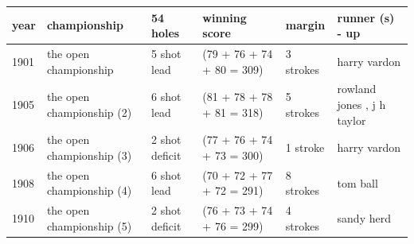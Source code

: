 \documentclass{article}
\begin{document}
\begin{tabular}{llllll}
\toprule
year & championship & 54 holes & winning score & margin & runner (s) - up \\
\midrule
1901 & the open championship & 5 shot lead & (79 + 76 + 74 + 80 = 309) & 3 strokes & harry vardon \\
1905 & the open championship (2) & 6 shot lead & (81 + 78 + 78 + 81 = 318) & 5 strokes & rowland jones , j h taylor \\
1906 & the open championship (3) & 2 shot deficit & (77 + 76 + 74 + 73 = 300) & 1 stroke & harry vardon \\
1908 & the open championship (4) & 6 shot lead & (70 + 72 + 77 + 72 = 291) & 8 strokes & tom ball \\
1910 & the open championship (5) & 2 shot deficit & (76 + 73 + 74 + 76 = 299) & 4 strokes & sandy herd \\
\bottomrule
\end{tabular}
\end{document}
